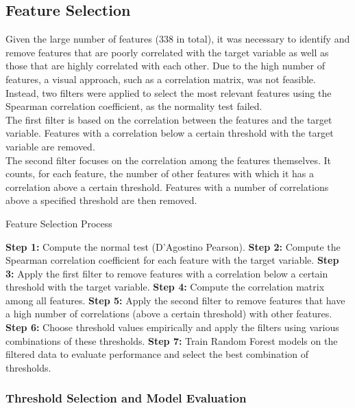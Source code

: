 \subsection{Feature Selection}
Given the large number of features (338 in total), it was necessary to identify and remove features that are poorly correlated with
the target variable as well as those that are highly correlated with each other. Due to the high number of features, a visual approach,
such as a correlation matrix, was not feasible. Instead, two filters were applied to select the most
relevant features using the Spearman correlation coefficient, as the normality test failed.\\
The first filter is based on the correlation between the features and the target variable. Features with a correlation below a certain
threshold with the target variable are removed.\\
The second filter focuses on the correlation among the features themselves.
It counts, for each feature, the number of other features with which it has a correlation above a certain threshold. Features with a
number of correlations above a specified threshold are then removed.\\

\begin{algorithm}
    \caption{Feature Selection Process}
    \begin{algorithmic}[1]
        \State \textbf{Step 1:} Compute  the normal test (D'Agostino Pearson).
        \State \textbf{Step 2:} Compute the Spearman correlation coefficient for each feature with the target variable.
        \State \textbf{Step 3:} Apply the first filter to remove features with a correlation below a certain threshold with the target variable.
        \State \textbf{Step 4:} Compute the correlation matrix among all features.
        \State \textbf{Step 5:} Apply the second filter to remove features that have a high number of correlations (above a certain threshold)
        with other features.
        \State \textbf{Step 6:} Choose threshold values empirically and apply the filters using various combinations of these thresholds.
        \State \textbf{Step 7:} Train Random Forest models on the filtered data to evaluate performance and select the best combination of thresholds.
    \end{algorithmic}
\end{algorithm}

\subsubsection*{Threshold Selection and Model Evaluation}

